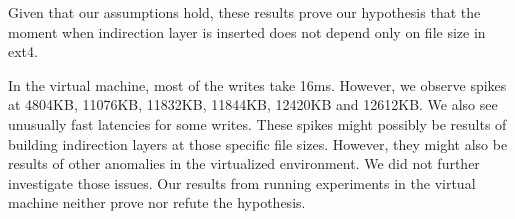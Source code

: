 Given that our assumptions hold, these results prove our hypothesis that the moment when indirection layer is inserted does not depend only on file size in ext4.

In the virtual machine, most of the writes take 16ms. However, we observe spikes at 4804KB, 11076KB, 11832KB, 11844KB, 12420KB and 12612KB. We also see unusually fast latencies for some writes. These spikes might possibly be results of building indirection layers at those specific file sizes. However, they might also be results of other anomalies in the virtualized environment. We did not further investigate those issues. Our results from running experiments in the virtual machine neither prove nor refute the hypothesis.


